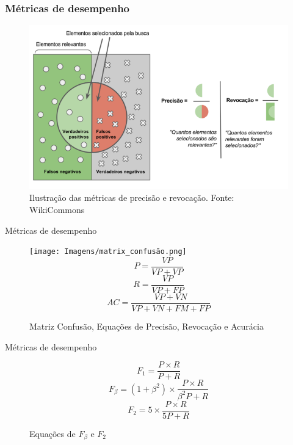 \documentclass[8pt]{beamer}
\begin{document}
\begin{frame}
        \frametitle{Métricas de desempenho}
        \begin{figure}[!ht]
            \centering
                \includegraphics[width=0.7\columnwidth]{Imagens/Precisão_e_revocação_cropped.png}
            \caption{Ilustração das métricas de precisão e revocação. Fonte: WikiCommons}         
        \end{figure}
\end{frame}  


\begin{frame}{Métricas de desempenho}
    \begin{figure}[!ht]
        \centering
            \texttt{[image: Imagens/matrix\_confusão.png]}
            \begin{equation} P = \frac{VP}{VP + VP} \end{equation}
            \begin{equation}R = \frac{VP}{VP + FP}\end{equation}
            \begin{equation}AC = \frac{VP + VN}{VP + VN + FM + FP}\end{equation}
        \caption{Matriz Confusão, Equações de Precisão, Revocação e Acurácia}         
    \end{figure}
\end{frame}

\begin{frame}{Métricas de desempenho}
    \begin{figure}[!ht]
        \centering
        \begin{equation}F_1 = \frac {P \times R}{P + R}\end{equation}
            \begin{equation}F_\beta = (1+\beta^2) \times \frac {P \times R}{\beta^2 P + R}\end{equation}
            \begin{equation}F_2 = 5 \times \frac {P \times R}{5 P + R}\end{equation}    
        \caption{Equações de $F_\beta$ e $F_2$}         
    \end{figure}
\end{frame} 
\end{document}

